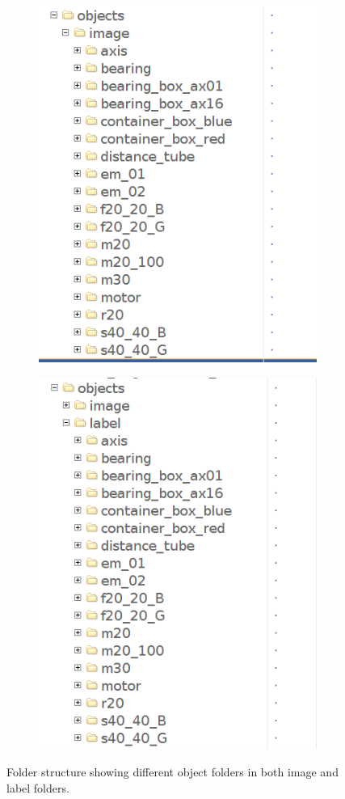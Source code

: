 \begin{center}
	\begin{figure}
		\begin{subfigure}{.5\textwidth}
			\centering
			\includegraphics[width=.7\linewidth]{images/folder_image}
			\label{Fig:fsila}
		\end{subfigure}
		\begin{subfigure}{.5\textwidth}
			\centering
			\includegraphics[width=.7\linewidth]{images/folder_label}
			\label{Fig:fsilb}
		\end{subfigure}
		\caption{Folder structure showing different object folders in both image and label folders.}
		\label{Fig:fsil}
	\end{figure}
\end{center}

